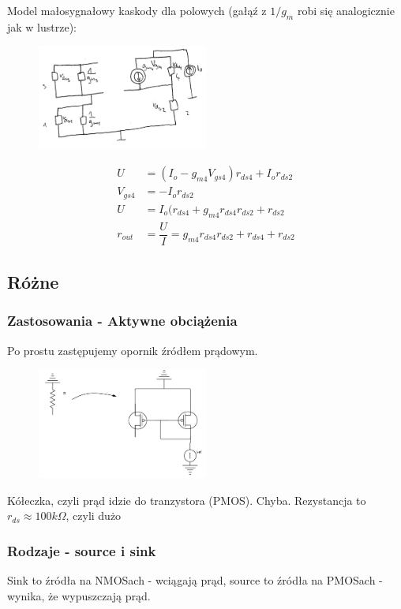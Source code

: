 \documentclass[10pt,a4paper]{article}
\begin{document}
Model małosygnałowy kaskody dla polowych (gałąź z $1/g_{m}$ robi się analogicznie jak w lustrze):
\begin{figure}[H]
\centering
\includegraphics[width=0.5\textwidth]{kaskoda_wypr.png}
\end{figure}
\begin{align*}
U&=(I_o-g_{m4}V_{gs4})r_{ds4}+I_o r_{ds2} \\
V_{gs4}&=-I_o r_{ds2} \\
U&=I_o(r_{ds4}+g_{m4}r_{ds4}r_{ds2}+r_{ds2} \\
r_{out}&=\dfrac{U}{I}=g_{m4}r_{ds4}r_{ds2}+r_{ds4}+r_{ds2}
\end{align*}

\subsection{Różne}
\subsubsection{Zastosowania - Aktywne obciążenia}
Po prostu zastępujemy opornik źródłem prądowym.
\begin{figure}[H]
\centering
\includegraphics[width=0.5\textwidth]{lustroZast}
\end{figure}
Kółeczka, czyli prąd idzie do tranzystora (PMOS). Chyba. Rezystancja to $r_{ds} \approx 100k \Omega$, czyli dużo 

\subsubsection{Rodzaje - source i sink}
Sink to źródła na NMOSach - wciągają prąd, source to źródła na PMOSach - wynika, że wypuszczają prąd.
\end{document}
